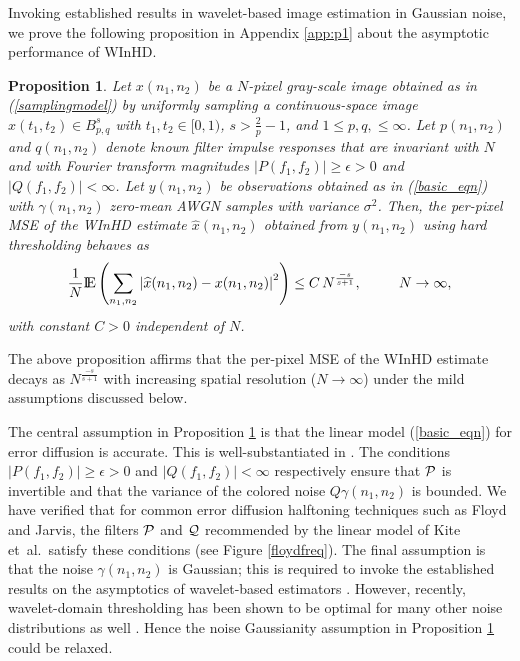\documentclass[11pt]{article}
\def\nnnx {n_1}
\def\nnny {n_2}
\def\fffx {f_1}
\def\fffy {f_2}
\def\tttx {t_1}
\def\ttty {t_2}
\def\NSQ{N}
\newcommand{\expect}{{\rm I \mkern-2.5mu \nonscript\mkern-.5mu E}}
\newtheorem{proposition}{Proposition}
\def\cP { {\cal{P}} }
\def\cQ { {\cal{Q}} }
\begin{document}
Invoking established results in wavelet-based image estimation in
Gaussian noise, we prove the following proposition in Appendix
\ref{app:p1} about the asymptotic performance of \mbox{WInHD}.
\begin{proposition}
\sloppy Let $x(\nnnx,\nnny)$ be a $N$-pixel gray-scale image obtained
as in (\ref{samplingmodel}) by uniformly sampling a continuous-space
image $x(\tttx,\ttty) \in B_{p,q}^s$ with $\tttx,\ttty\in [0,1)$, 
$s>\frac{2}{p} -1$, and $1\le p,q,\le \infty$. Let $p(\nnnx,\nnny)$ and
$q(\nnnx,\nnny)$ denote known filter impulse responses that are
invariant with $N$ and with Fourier transform magnitudes
$|P(\fffx,\fffy)| \ge \epsilon > 0$ and $|Q(\fffx,\fffy)| <
\infty$. Let $y(\nnnx,\nnny)$ be observations obtained as in
(\ref{basic_eqn}) with $\gamma(\nnnx,\nnny)$ zero-mean AWGN samples
with variance $\sigma^2$. Then, the per-pixel MSE of the
\mbox{WInHD} estimate $\widehat{x}(\nnnx,\nnny)$ obtained from
$y(\nnnx,\nnny)$ using hard thresholding behaves as
\begin{equation}
\frac{1}{\NSQ }\expect\left(\sum_{\nnnx,\nnny}
\left|\widehat{x}(\nnnx,\nnny) - x(\nnnx,\nnny)\right|^2\right) \le C\,
N^{\frac{-s}{s+1}},~~~~~~~~N\rightarrow \infty,
\label{prop1:eqn1}
\end{equation} 
with constant $C > 0$ independent of $N$.
\label{proposition1}
\end{proposition}
The above proposition affirms that the per-pixel MSE of the \mbox{WInHD}
estimate decays as $N^\frac{-s}{s+1}$ with increasing spatial
resolution ($N \rightarrow \infty$) under the mild assumptions
discussed below. 

The central assumption in Proposition \ref{proposition1} is that the
linear model (\ref{basic_eqn}) for error diffusion is accurate. This
is well-substantiated in \cite{Kite,KiteJournal}. The conditions
$|P(\fffx,\fffy)| \ge \epsilon > 0$ and $|Q(\fffx,\fffy)| < \infty$
respectively ensure that $\cP$ is invertible and that the variance of
the colored noise $Q\gamma(\nnnx,\nnny)$ is bounded. We have verified that
for common error diffusion halftoning techniques such as Floyd and
Jarvis, the filters $\cP$ and $\cQ$ recommended by the linear model of
Kite et~al.\ satisfy these conditions (see Figure
\ref{floydfreq}). The final assumption is that the noise
$\gamma(\nnnx,\nnny)$ is Gaussian; this is required to invoke the
established results on the asymptotics of wavelet-based estimators
\cite{Donoho1}.  However, recently, wavelet-domain thresholding has
been shown to be optimal for many other noise distributions as well
\cite{Averkamp,Gao}. Hence the noise Gaussianity assumption in
Proposition \ref{proposition1} could be relaxed.
\end{document}
